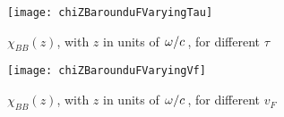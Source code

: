 \documentclass[../main.tex]{subfiles}
\begin{document}
	\begin{figure}[htp]
		\centering
		\texttt{[image: chiZBarounduFVaryingTau]}
		\caption{$\chi_{BB}(z)$, with $z$ in units of $\flatfrac{\omega}{c}$, for different $\tau$} \label{fig:tau}
	\end{figure}

	\begin{figure}[htp]
		\centering
		\texttt{[image: chiZBarounduFVaryingVf]}
		\caption{$\chi_{BB}(z)$, with $z$ in units of $\flatfrac{\omega}{c}$, for different $v_F$} \label{fig:vf}
	\end{figure}
\end{document}
